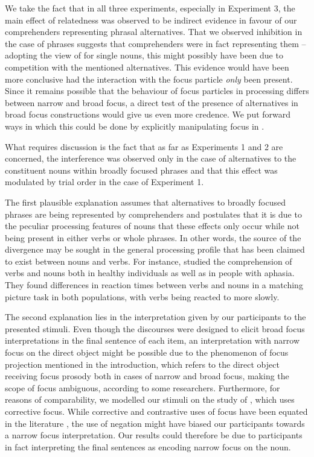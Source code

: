 \documentclass[output=paper,colorlinks,citecolor=brown]{langscibook}
\begin{document}
We take the fact that in all three experiments, especially in Experiment 3, the main effect of relatedness was observed to be indirect evidence in favour of our comprehenders representing phrasal alternatives. That we observed inhibition in the case of phrases suggests that comprehenders were in fact representing them -- adopting the view of \citet{gotzner2016impact} for single nouns, this might possibly have been due to competition with the mentioned alternatives. This evidence would have been more conclusive had the interaction with the focus particle \textit{only} been present. Since it remains possible that the behaviour of focus particles in processing differs between narrow and broad focus, a direct test of the presence of alternatives in broad focus constructions would give us even more credence.
We put forward ways in which this could be done by explicitly manipulating focus in .

What requires discussion is the fact that as far as Experiments 1 and 2 are concerned, the interference was observed only in the case of alternatives to the constituent nouns within broadly focused phrases and that this effect was modulated by trial order in the case of Experiment 1.


The first plausible explanation assumes that alternatives to broadly focused phrases are being represented by comprehenders and postulates that it is due to the peculiar processing features of nouns that these effects only occur while not being present in either verbs or whole phrases. In other words, the source of the divergence may be sought in the general processing profile that has been claimed to exist between nouns and verbs. For instance, \citet{soloukhina2018investigating} studied the comprehension of verbs and nouns both in healthy individuals as well as in people with aphasia. They found differences in reaction times between verbs and nouns in a matching picture task in both populations, with verbs being reacted to more slowly.


The second explanation lies in the interpretation given by our participants to the presented stimuli. Even though the discourses were designed to elicit broad focus interpretations in the final sentence of each item, an interpretation with narrow focus on the direct object might be possible due to the phenomenon of focus projection \citep{selkirk1995sentence,gussenhoven1999discreteness} mentioned in the introduction, which refers to the direct object receiving focus prosody both in cases of narrow and broad focus, making the scope of focus ambiguous, according to some researchers. Furthermore, for reasons of comparability, we modelled our stimuli on the study of \citet{gotzner2016impact}, which uses corrective focus. While corrective and contrastive uses of focus have been equated in the literature \citep[e.g.,][]{zimmermann2008contrastive}, the use of negation might have biased our participants towards a narrow focus interpretation. Our results could therefore be due to participants in fact interpreting the final sentences as encoding narrow focus on the noun.
\end{document}
